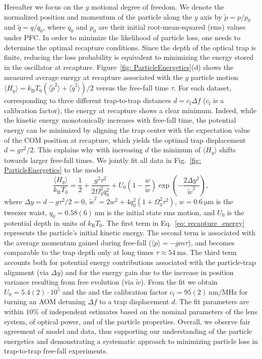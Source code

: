 \documentclass[twocolumn,preprintnumbers,superscriptaddress,amsmath,amssymb,aps,pra,10pt]{revtex4-1}
\newcommand{\<}{\langle}
\renewcommand{\>}{\rangle}
\newcommand{\kb}{k_\text{B}}
\renewcommand{\>}{\rangle}
\begin{document}
Hereafter we focus on the $y$ motional degree of freedom.
%
We denote the normalized position and momentum of the particle along the $y$ axis by $\tilde{p}=p/p_0$ and $\tilde{q}=q/q_0$, where $q_0$ and $p_0$ are their initial root-mean-squared (rms) values under PFC.
%
In order to minimize the likelihood of particle loss, one needs to determine the optimal recapture conditions.
%
Since the depth of the optical trap is finite, reducing the loss probability is equivalent to minimizing the energy stored in the oscillator at recapture.
%
Figure~\ref{fig: ParticleEnergetics}(d) shows the measured average energy at recapture associated with the $y$ particle motion $\langle H_y \rangle  = \kb T_0 (\langle\tilde{p}^2\rangle+\langle\tilde{q}^2\rangle)/2$ versus the free-fall time $\tau$.
%
For each dataset, corresponding to three different trap-to-trap distances $d=c_\text{f}\Delta f$ ($c_\text{f}$ is a calibration factor), the energy at recapture shows a clear minimum. 
%
Indeed, while the kinetic energy monotonically increases with free-fall time, the potential energy can be minimized by aligning the trap center with the expectation value of the COM position at recapture, which yields the optimal trap displacement $d= g\tau^2/2$.
%
This explains why with increasing $d$ the minimum of $\langle H_y \rangle$ shifts towards larger free-fall times.
%
We jointly fit all data in Fig.~\ref{fig: ParticleEnergetics} to the model \cite{supplemental}
%
\begin{equation}\label{eq: recapture_energy}
	\frac{\langle H_y \rangle}{\kb T_0}=\frac{1}{2}+\frac{g^2\tau^2}{2\Omega_y^2 q_\text{0}^2} + U_0\left(1-\frac{w}{\tilde{w}}\right)\exp(-\frac{2\Delta y^2}{\tilde{w}^2}),
\end{equation}
%
where $\Delta y= d-g\tau^2/2=0$, $\tilde{w}^2=2 w^2+ 4 q_0^2(1+\Omega_y^2\tau^2)$, $w=0.6~\mathrm{\mu m}$ is the tweezer waist, $q_0=0.58(6)~\mathrm{nm}$ is the initial state rms motion, and $U_0$ is the potential depth in units of $\kb T_0$.
%
The first term in Eq.~\eqref{eq: recapture_energy} represents the particle's initial kinetic energy. 
%
The second term is associated with the average momentum gained during free-fall ($\langle p \rangle=-gm\tau$), and becomes comparable to the trap depth only at long times $\tau\approx 54~\mathrm{ms}$.
%
The third term accounts both for potential energy contributions associated with the particle-trap alignment (via $\Delta y$) and for the energy gain due to the increase in position variance resulting from free evolution (via $\tilde{w}$).
%
From the fit we obtain $U_0=5.4(2)\cdot 10^5$ and the
and the calibration factor $c_\text{f}=95(2)~\mathrm{nm/MHz}$ for turning an AOM detuning $\Delta f$ to a trap displacement $d$.
%
The fit parameters are within $10\%$ of independent estimates based on the nominal parameters of the lens system, of optical power, and of the particle properties.
%
Overall, we observe fair agreement of model and data, thus supporting our understanding of the particle energetics and demonstrating a systematic approach to minimizing particle loss in trap-to-trap free-fall experiments.
\end{document}
